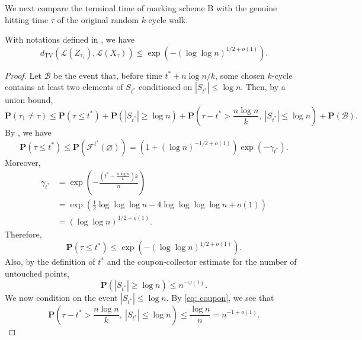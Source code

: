 
We next compare the terminal time of marking scheme B with the genuine hitting time $\tau$ of the original random $k$-cycle walk.

\begin{lemma}\label{lemma: Z,X gap}
    With notations defined in , we have 
    $$d_{\mathrm{TV}}(\mathcal{L}(Z_{\tau_1}),\mathcal{L}(X_{\tau}))\leq \exp\left(-(\log\log n)^{1/2+o(1)}\right).$$
\end{lemma}

\begin{proof}
Let $\mathcal B$ be the event that, before time
$t^*+ n\log n/k$, some chosen $k$-cycle contains at least two elements of $S_{t^*}$ conditioned on $|S_{t^*}|\leq \log n$. Then, by a union bound,
$$
\mathbf P(\tau_1\neq \tau)\leq\mathbf P(\tau\leq t^*)+\mathbf P(|S_{t^*}|\geq \log n) +\mathbf P\left(\tau-t^*>\frac{n\log n}{k},\ |S_{t^*}|\leq \log n\right)+\mathbf P(\mathcal B).
$$
By , we have
$$
    \mathbf P(\tau\leq t^*)
    \leq \mathbf P(\mathcal F^{t^*}(\varnothing)) =\left(1+(\log n)^{-1/2+o(1)}\right)
    \exp(-\gamma_{t^*}).
$$
Moreover,
\begin{align*}
    \gamma_{t^*}
    &=\exp\left(
    -\frac{\left(t^*-\frac{n\log n}{k}\right)k}{n}
    \right) \\
    &=\exp\left(
    \frac{1}{2}\log\log\log n
    -4\log\log\log\log n
    +o(1)
    \right) \\
    &=(\log\log n)^{1/2+o(1)}.
\end{align*}
Therefore,
\begin{equation}\label{eq: finish early}
    \mathbf P(\tau\leq t^*)
    \leq \exp\left(-(\log\log n)^{1/2+o(1)}\right).
\end{equation}
Also, by the definition of $t^*$ and the coupon-collector estimate for the number of untouched
points,
\begin{equation}
    \mathbf P(|S_{t^*}|\geq \log n)\leq n^{-\omega(1)}.
\end{equation}
We now condition on the event $|S_{t^*}|\leq \log n$.
By \eqref{eq: coupon}, we see that
$$\mathbf P\left(\tau-t^*>\frac{n\log n}{k},\ |S_{t^*}|\leq \log n\right)\leq\frac{\log n}{n}
    = n^{-1+o(1)}.$$


\end{proof}
